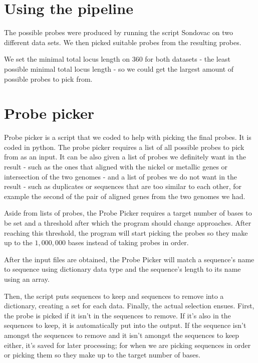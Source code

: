 
\section{Using the pipeline}
The possible probes were produced by running the script Sondovac on two different data sets. We then picked suitable probes from 
the resulting probes. 

We set the minimal total locus length on $360$ for both datasets - the least possible minimal total locus length - so we could get 
the largest amount of possible probes to pick from. 



\section{Probe picker}
Probe picker is a script that we coded to help with picking the final probes. It is coded in python. The probe picker requires 
a list of all possible probes to pick from as an input. It can be also given a list of probes we definitely want in the result - such as the 
ones that aligned with the nickel or metallic genes or intersection of the two genomes - and a list of probes we do not want in 
the result - such as duplicates or sequences that are too similar to each other, for 
example the second of the pair of aligned genes from the two genomes we had. 

Aside from lists of probes, the Probe Picker requires a target number of bases to be set and a threshold after which the program should 
change approaches. After reaching this threshold, the program will start picking the probes so they make up to the $1,000,000$ bases instead of 
taking probes in order. 

After the input files are obtained, the Probe Picker will match a sequence's name to sequence using dictionary data type and the sequence's length to 
its name using an array. 

Then, the script puts sequences to keep and sequences to remove into a dictionary, creating a set for each data. 
Finally, the actual selection ensues. 
First, the probe is picked if it isn't in the sequences to remove. If it's also in the sequences to keep, it is automatically put into the output. 
If the sequence isn't amongst the sequences to remove and it isn't amongst the sequences to keep either, it's saved for later processing; for when we are 
picking sequences in order or picking them so they make up to the target number of bases. 


